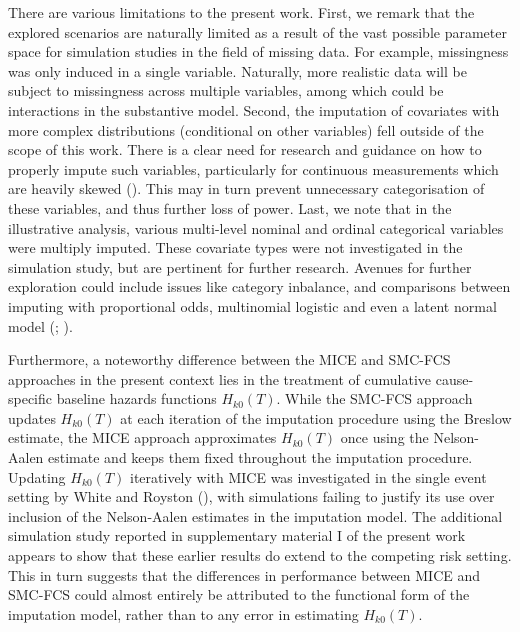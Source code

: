 \documentclass[
  letterpaper,
  DIV=11,
  numbers=noendperiod]{scrreprt}
\begin{document}
There are various limitations to the present work. First, we remark that
the explored scenarios are naturally limited as a result of the vast
possible parameter space for simulation studies in the field of missing
data. For example, missingness was only induced in a single variable.
Naturally, more realistic data will be subject to missingness across
multiple variables, among which could be interactions in the substantive
model. Second, the imputation of covariates with more complex
distributions (conditional on other variables) fell outside of the scope
of this work. There is a clear need for research and guidance on how to
properly impute such variables, particularly for continuous measurements
which are heavily skewed
(). This may in turn prevent unnecessary categorisation of these
variables, and thus further loss of power. Last, we note that in the
illustrative analysis, various multi-level nominal and ordinal
categorical variables were multiply imputed. These covariate types were
not investigated in the simulation study, but are pertinent for further
research. Avenues for further exploration could include issues like
category inbalance, and comparisons between imputing with proportional
odds, multinomial logistic and even a latent normal model
(; ).

Furthermore, a noteworthy difference between the MICE and SMC-FCS
approaches in the present context lies in the treatment of cumulative
cause-specific baseline hazards functions \(H_{k0}(T)\). While the
SMC-FCS approach updates \(H_{k0}(T)\) at each iteration of the
imputation procedure using the Breslow estimate, the MICE approach
approximates \(H_{k0}(T)\) once using the Nelson-Aalen estimate and
keeps them fixed throughout the imputation procedure. Updating
\(H_{k0}(T)\) iteratively with MICE was investigated in the single event
setting by White and Royston
(), with
simulations failing to justify its use over inclusion of the
Nelson-Aalen estimates in the imputation model. The additional
simulation study reported in supplementary material I of the present
work appears to show that these earlier results do extend to the
competing risk setting. This in turn suggests that the differences in
performance between MICE and SMC-FCS could almost entirely be attributed
to the functional form of the imputation model, rather than to any error
in estimating \(H_{k0}(T)\).
\end{document}
